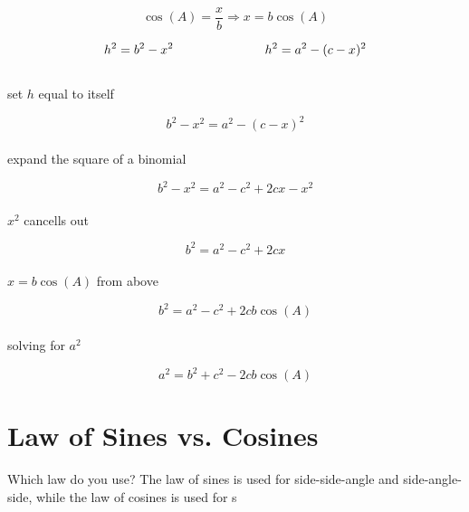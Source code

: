 \documentclass[12pt]{article}
\begin{document}
$$\cos(A)=\frac{x}{b} \Longrightarrow x=b\cos(A)$$

$$h^2=b^2-x^2 \hspace*{1in} h^2=a^2-(c-x)^2$$\\

set $h$ equal to itself

$$b^2-x^2=a^2-(c-x)^2$$\\

expand the square of a binomial

$$b^2-x^2=a^2-c^2+2cx-x^2$$\\

$x^2$ cancells out

$$b^2=a^2-c^2+2cx$$\\

$x=b\cos(A)$ from above

$$b^2=a^2-c^2+2cb\cos(A)$$\\

solving for $a^2$

$$a^2=b^2+c^2-2cb\cos(A)$$







\section*{Law of Sines vs. Cosines}

Which law do you use? The law of sines is used for side-side-angle and side-angle-side, while the law of cosines is used for s
\end{document}

